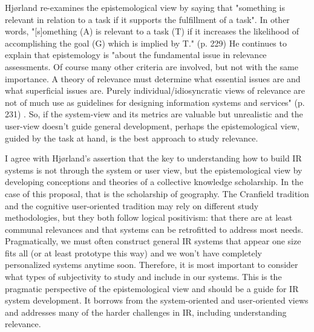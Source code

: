 Hjørland re-examines the epistemological view by saying that "something is relevant in relation to a task if it supports the fulfillment of a task". In other words, "[s]omething (A) is relevant to a task (T) if it increases the likelihood of accomplishing the goal (G) which is implied by T." \cite{Hjorland2010}(p. 229) He continues to explain that epistemology is "about the fundamental issue in relevance assessments. Of course many other criteria are involved, but not with the same importance. A theory of relevance must determine what essential issues are and what superficial issues are. Purely individual/idiosyncratic views of relevance are not of much use as guidelines for designing information systems and services" \cite{Hjorland2010}(p. 231) \cite{Hjorland2002}. So, if the system-view and its metrics are valuable but unrealistic and the user-view doesn't guide general development, perhaps the epistemological view, guided by the task at hand, is the best approach to study relevance.

I agree with Hjørland's assertion that the key to understanding how to build IR systems is not through the system or user view, but the epistemological view by developing conceptions and theories of a collective knowledge scholarship. In the case of this proposal, that is the scholarship of geography. The Cranfield tradition and the cognitive user-oriented tradition may rely on different study methodologies, but they both follow logical positivism: that there are at least communal relevances and that systems can be retrofitted to address most needs. Pragmatically, we must often construct general IR systems that appear one size fits all (or at least prototype this way) and we won't have completely personalized systems anytime soon. Therefore, it is most important to consider what types of subjectivity to study and include in our systems. This is the pragmatic perspective of the epistemological view and should be a guide for IR system development. It borrows from the system-oriented and user-oriented views and addresses many of the harder challenges in IR, including understanding relevance.